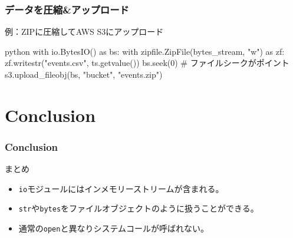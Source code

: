 \documentclass[aspectratio=169,dvipdfmx,14pt,notheorems]{beamer}
\theoremstyle{definition}
\begin{document}
\begin{frame}[fragile]\frametitle{データを圧縮\&アップロード}

\begin{exampleblock}{例：ZIPに圧縮してAWS S3にアップロード}
\begin{pygments}{python}
with io.BytesIO() as bs:
    with zipfile.ZipFile(bytes_stream, "w") as zf:
        zf.writestr("events.csv", ts.getvalue())
    bs.seek(0)  # ファイルシークがポイント
    s3.upload_fileobj(bs, "bucket", "events.zip")
\end{pygments}
\end{exampleblock}

\end{frame}

\section{Conclusion}

\begin{frame}[fragile]\frametitle{Conclusion}
\begin{block}{まとめ}
\begin{itemize}
\item \texttt{io}モジュールにはインメモリーストリームが含まれる。
\item \texttt{str}や\texttt{bytes}をファイルオブジェクトのように扱うことができる。
\item 通常の\texttt{open}と異なりシステムコールが呼ばれない。
\end{itemize}
\end{block}
\end{frame}
\end{document}

